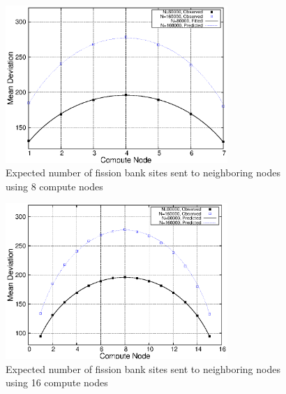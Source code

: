 \documentclass[11pt]{article}
\begin{document}
\clearpage
\begin{figure}[p]
  \centering
  \includegraphics[width=0.75\textwidth]{plot8.eps}
  \caption{Expected number of fission bank sites sent to neighboring
    nodes using 8 compute nodes}
  \label{fig:mean-deviance8}
\end{figure}

\clearpage
\begin{figure}[p]
  \centering
  \includegraphics[width=0.75\textwidth]{plot16.eps}
  \caption{Expected number of fission bank sites sent to neighboring
    nodes using 16 compute nodes}
  \label{fig:mean-deviance16}
\end{figure}
\end{document}
